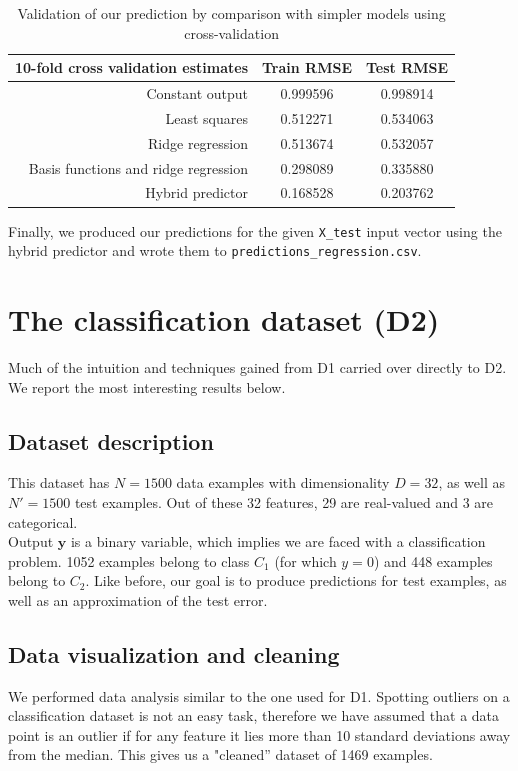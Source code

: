 \documentclass{article} %
\begin{document}
  \begin{table}[h]
    \center
    \begin{tabular}{|r|c|c|}
      \hline
      \textbf{10-fold cross validation estimates} & Train RMSE & Test RMSE \\
      \hline
      Constant output                             & 0.999596   & 0.998914  \\
      \hline
      Least squares                               & 0.512271   & 0.534063  \\
      \hline
      Ridge regression                            & 0.513674   & 0.532057  \\
      \hline
      Basis functions and ridge regression        & 0.298089   & 0.335880  \\
      \hline
      Hybrid predictor                            & 0.168528   & 0.203762  \\
      \hline
    \end{tabular}
    \caption{Validation of our prediction by comparison with simpler models using cross-validation}
    \label{predictorValidation}
  \end{table}

  Finally, we produced our predictions for the given \texttt{X\_test} input vector using the hybrid predictor and wrote them to \texttt{predictions\_regression.csv}.

\section{The classification dataset (D2)}
  Much of the intuition and techniques gained from D1 carried over directly to D2. We report the most interesting results below.

  \subsection{Dataset description}
  This dataset has $N = 1500$ data examples with dimensionality $D = 32$, as well as $N' = 1500$ test examples. Out of these 32 features, 29 are real-valued and 3 are categorical.\\
  Output $\mathbf{y}$ is a binary variable, which implies we are faced with a classification problem. 1052 examples belong to class $C_1$ (for which $y = 0$) and 448 examples belong to $C_2$. Like before, our goal is to produce predictions for test examples, as well as an approximation of the test error.

  \subsection{Data visualization and cleaning}
  We performed data analysis similar to the one used for D1. Spotting outliers on a classification dataset is not an easy task, therefore we have assumed that a data point is an outlier if for any feature it lies more than 10 standard deviations away from the median. This gives us a "cleaned'' dataset of 1469 examples.
\end{document}
